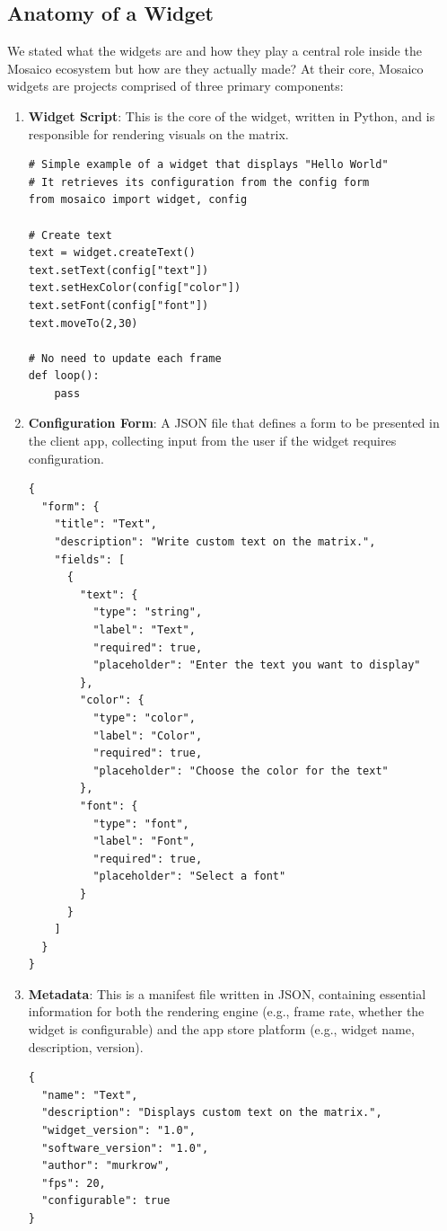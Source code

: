 \subsection{Anatomy of a Widget}
We stated what the widgets are and how they play a central role inside the Mosaico ecosystem but how are they actually made?
At their core, Mosaico widgets are projects comprised of three primary components:

\begin{enumerate}
    \item \textbf{Widget Script}: This is the core of the widget, written in Python, and is responsible for rendering visuals on the matrix.

\begin{verbatim}
# Simple example of a widget that displays "Hello World"
# It retrieves its configuration from the config form
from mosaico import widget, config

# Create text
text = widget.createText()
text.setText(config["text"])
text.setHexColor(config["color"])
text.setFont(config["font"])
text.moveTo(2,30)

# No need to update each frame
def loop():
    pass
\end{verbatim}

    \item \textbf{Configuration Form}: A JSON file that defines a form to be presented in the client app, collecting input from the user if the widget requires configuration.

\begin{verbatim}
{
  "form": {
    "title": "Text",
    "description": "Write custom text on the matrix.",
    "fields": [
      {
        "text": {
          "type": "string",
          "label": "Text",
          "required": true,
          "placeholder": "Enter the text you want to display"
        },
        "color": {
          "type": "color",
          "label": "Color",
          "required": true,
          "placeholder": "Choose the color for the text"
        },
        "font": {
          "type": "font",
          "label": "Font",
          "required": true,
          "placeholder": "Select a font"
        }
      }
    ]
  }
}
\end{verbatim}
\newpage
    \item \textbf{Metadata}: This is a manifest file written in JSON, containing essential information for both the rendering engine (e.g., frame rate, whether the widget is configurable) and the app store platform (e.g., widget name, description, version).

\begin{verbatim}
{
  "name": "Text",
  "description": "Displays custom text on the matrix.",
  "widget_version": "1.0",
  "software_version": "1.0",
  "author": "murkrow",
  "fps": 20,
  "configurable": true
}
\end{verbatim}
\end{enumerate}
